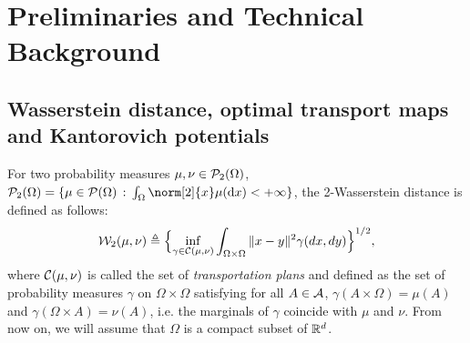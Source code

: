 
\section{Preliminaries and Technical Background}
\label{sec:techbg}




\vspace{-5pt}

\subsection{Wasserstein distance, optimal transport maps and Kantorovich potentials }
%
For two probability measures $\mu,\nu \in {\cal P}_2(\Omega)$, $\PS_2(\Omega) = \{ \mu \in \PS(\Omega) \, :\, \int_{\Omega} \norm[2]{x} \mu(\rmd x) < \plusinfty\}$, the 2-Wasserstein distance is defined as follows:
\begin{align}
{\cal W}_2(\mu,\nu) \triangleq \Bigl\{ \inf_{\gamma \in {\cal C}(\mu,\nu)} \int_{\Omega \times \Omega} \|x-y\|^2 \gamma(dx , dy) \Bigr\}^{1/2}, \label{eqn:w2}
\end{align}
where ${\cal C}(\mu,\nu)$ is called the set of \emph{transportation plans} and defined as the set of probability measures $\gamma$ on $\Omega \times \Omega$ satisfying for all $A \in {\cal A}$, $\gamma(A \times \Omega) = \mu(A)$ and $\gamma(\Omega \times A)=\nu(A)$, i.e. the  marginals of $\gamma$  coincide with $\mu$ and $\nu$. From now on, we will assume that $\Omega$ is a compact subset of $\mathbb{R}^d$.


